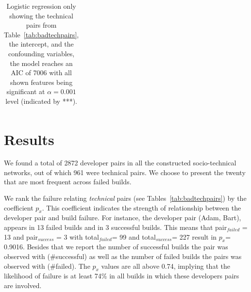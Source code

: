 \begin{table}[t!]
\begin{tabular}{cccc}
%
%
\bottomrule
\end{tabular}
\caption{Logistic regression only showing the technical pairs from Table~\ref{tab:badtechpairs}, the intercept, and the confounding variables, the model reaches an AIC of 7006 with all shown features being significant at $\alpha=0.001$ level (indicated by ***).}
\label{tab:regression}
\end{table}





\section{Results}
\label{ch:fse:result2}
We found a total of 2872 developer pairs in all the constructed
socio-technical networks, out of which 961 were technical pairs. %
We choose to present the twenty that are most frequent across failed builds.

We rank the failure relating \emph{technical} pairs (see Tables~\ref{tab:badtechpairs})
by the coefficient $p_{x}$. This coefficient indicates the strength of
relationship between the developer pair and build failure. For instance, the
developer pair (Adam, Bart), appears in 13 failed builds and in 3
successful builds. This means that pair$_{failed}$ = 13 and pair$_{success}$ = 3
with total$_{failed}$= 99 and total$_{success}$= 227 result in $p_x$= 0.9016.
Besides that we report the number of successful builds the pair was observed with
(\#successful) as well as the number of failed builds the pairs was observed with
(\#failed). The $p_x$ values are all above 0.74, implying that the likelihood
of failure is at least 74\% in all builds in which these developers pairs are
involved. 

